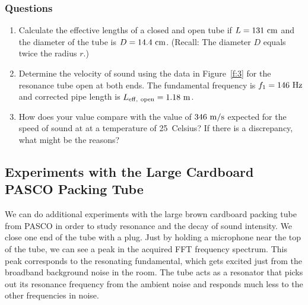 \documentclass[11pt]{NSF}
\def\ben{\begin{enumerate}}
\def\een{\end{enumerate}}
\def\i{\item{}}
\begin{document}
\subsubsection*{Questions}
\ben
\i Calculate the effective lengths of a closed and open
tube if $L=131~{\rm cm}$ and the diameter of the tube
is $D=14.4~{\rm cm}$.  
(Recall: The diameter  $D$ equals twice the radius $r$.)

\i Determine the velocity of sound using the data in 
Figure~\ref{f:3} for the resonance tube open at both ends.
The fundamental frequency is $f_1 = 146~{\rm Hz}$ and 
corrected pipe length is $L_{\rm eff,\ open}=1.18~{\rm m}$.

\i How does your value compare with the value of 
$346~{\rm m/s}$ expected for the speed of sound at
at a temperature of 25~Celsius?
If there is a discrepancy, what might be the reasons?

\een

\subsection{Experiments with the Large Cardboard PASCO Packing Tube}

We can do additional experiments with the large brown cardboard packing 
tube from PASCO in order to study resonance and the decay of sound intensity. 
We close one end of the tube with a plug. 
Just by holding a microphone near the top of the tube, 
we can see a peak in the acquired FFT frequency spectrum. 
This peak corresponds to the resonating fundamental, which gets excited just from
the broadband background noise in the room. The tube acts as a resonator that
picks out its resonance frequency from the ambient noise and responds much less
to the other frequencies in noise.
\end{document}
